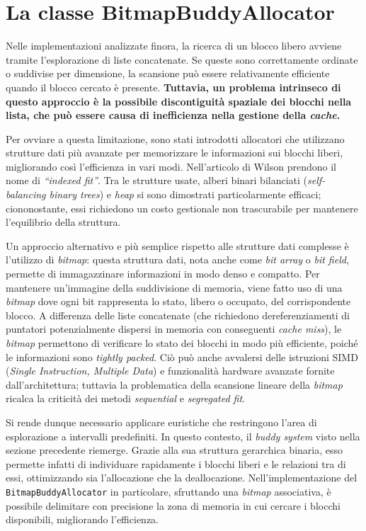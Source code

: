 \section{La classe BitmapBuddyAllocator}
Nelle implementazioni analizzate finora, la ricerca di un blocco libero avviene tramite l'esplorazione di liste concatenate. Se queste sono correttamente ordinate o suddivise per dimensione, la scansione può essere relativamente efficiente quando il blocco cercato è presente. \textbf{Tuttavia, un problema intrinseco di questo approccio è la possibile discontiguità spaziale dei blocchi nella lista, che può essere causa di inefficienza nella gestione della \textit{cache}.}

Per ovviare a questa limitazione, sono stati introdotti allocatori che utilizzano strutture dati più avanzate per memorizzare le informazioni sui blocchi liberi, migliorando così l’efficienza in vari modi. Nell’articolo di Wilson prendono il nome di \textit{“indexed fit”}. Tra le strutture usate, alberi binari bilanciati (\textit{self-balancing binary trees}) e \textit{heap} si sono dimostrati particolarmente efficaci; ciononostante, essi richiedono un costo gestionale non trascurabile per mantenere l’equilibrio della struttura.

Un approccio alternativo e più semplice rispetto alle strutture dati complesse è l’utilizzo di \textit{bitmap}: questa struttura dati, nota anche come \textit{bit array} o \textit{bit field}, permette di immagazzinare informazioni in modo denso e compatto.  Per mantenere un'immagine della suddivisione di memoria, viene fatto uso di una \textit{bitmap} dove ogni bit rappresenta lo stato, libero o occupato, del corrispondente blocco. A differenza delle liste concatenate (che richiedono dereferenziamenti di puntatori potenzialmente dispersi in memoria con conseguenti \textit{cache miss}), le \textit{bitmap} permettono di verificare lo stato dei blocchi in modo più efficiente, poiché le informazioni sono \textit{tightly packed}. Ciò può anche avvalersi delle istruzioni SIMD (\textit{Single Instruction, Multiple Data}) e funzionalità hardware avanzate fornite dall’architettura; tuttavia la problematica della scansione lineare della \textit{bitmap} ricalca la criticità dei metodi \textit{sequential} e \textit{segregated fit}.

Si rende dunque necessario applicare euristiche che restringono l’area di esplorazione a intervalli predefiniti. In questo contesto, il \textit{buddy system} visto nella sezione precedente riemerge. Grazie alla sua struttura gerarchica binaria, esso permette infatti di individuare rapidamente i blocchi liberi e le relazioni tra di essi, ottimizzando sia l’allocazione che la deallocazione. Nell'implementazione del \texttt{BitmapBuddyAllocator} in particolare, sfruttando una \textit{bitmap} associativa, è possibile delimitare con precisione la zona di memoria in cui cercare i blocchi disponibili, migliorando l’efficienza.

